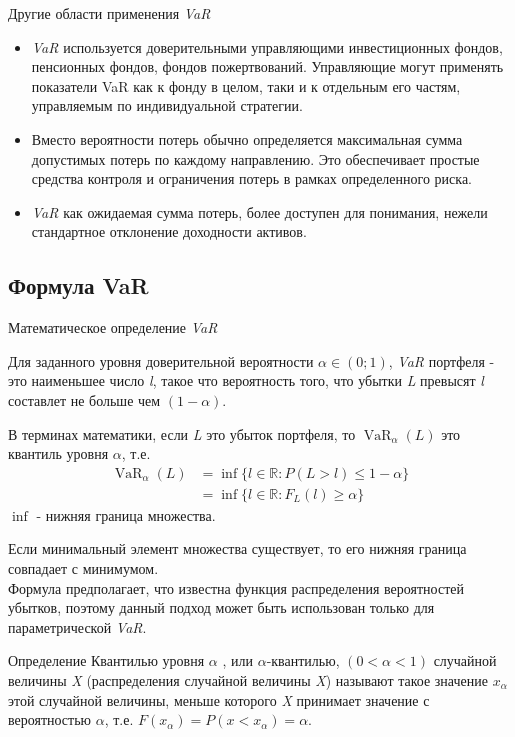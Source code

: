 \documentclass[_fin_decisions_lectures.tex]{subfiles}
\begin{document}
\begin{frame}[ allowframebreaks ]{Другие области применения \textit{VaR}}
 \begin{itemize}
 \item 
\textit{VaR }используется доверительными управляющими инвестиционных фондов, пенсионных фондов, фондов пожертвований. Управляющие могут применять показатели VaR как к фонду в целом, таки и к отдельным его частям, управляемым по индивидуальной стратегии.  
\pagebreak
\item
Вместо вероятности потерь обычно определяется максимальная сумма допустимых потерь по каждому направлению. Это обеспечивает простые средства контроля и ограничения потерь в рамках определенного риска. 
\pagebreak
\item
\textit{VaR }как ожидаемая сумма потерь, более доступен для понимания, нежели стандартное отклонение доходности активов.

 \end{itemize}
\end{frame}
\subsection{Формула VaR}
\begin{frame}[ allowframebreaks ]{Математическое определение \textit{VaR}}

Для заданного уровня доверительной вероятности $\alpha\in (0;1)$, \textit{VaR} портфеля - это наименьшее число \textit{l}, такое что вероятность того, что убытки \textit{L} превысят \textit{l} составлет не больше чем $(1-\alpha)$.

\pagebreak
В терминах математики, если \textit{L} это убыток портфеля, то $\operatorname{VaR}_{\alpha}(L)$ это квантиль уровня $\alpha$, т.е.
\begin{align}
\operatorname{VaR}_\alpha(L) & \nonumber
=\inf\{l \in \mathbb{R}:P(L>l)\le 1-\alpha\}\\ &
=\inf\{l\in \mathbb{R}:F_L(l) \ge \alpha\}\end{align}
$\inf$ - нижняя граница множества. 

\pagebreak
Если минимальный элемент множества существует, то его нижняя граница совпадает с минимумом.\\
Формула предполагает, что известна функция распределения вероятностей убытков, поэтому данный подход может быть использован только для параметрической \textit{VaR}.
\end{frame}
\begin{frame}
\begin{block}{Определение}
Квантилью уровня $\alpha$ , или $\alpha$-квантилью, $(0<\alpha<1)$ случайной величины \textit{X} (распределения случайной величины \textit{X}) называют такое значение $x_{\alpha}$ этой случайной величины, меньше которого \textit{X} принимает значение с вероятностью $\alpha$, т.е. $F(x_{\alpha}) = P(x < x_{\alpha}) = \alpha$. 
\end{block}
\end{frame}
\end{document}
